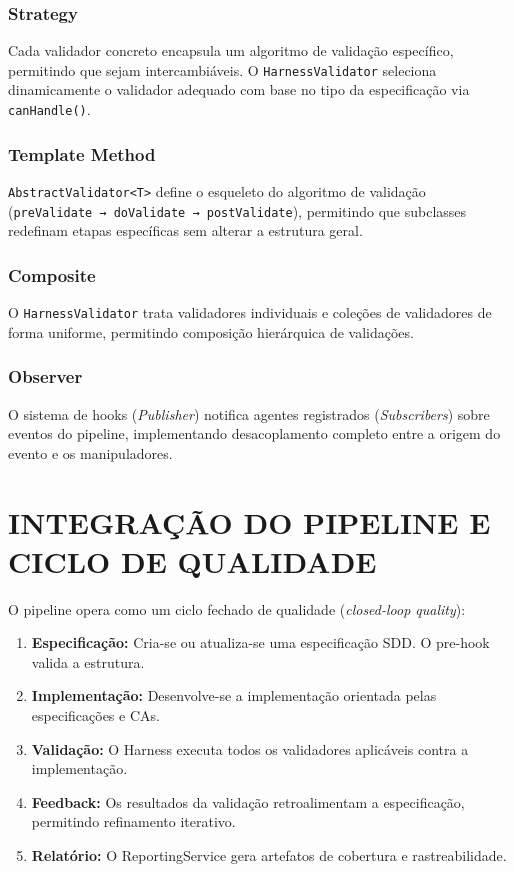 \documentclass[
  brazil,
  sumario=tradicional,
  10pt
]{abntex2}
\begin{document}
\subsubsection{Strategy}
Cada validador concreto encapsula um algoritmo de validação específico,
permitindo que sejam intercambiáveis. O \texttt{HarnessValidator}
seleciona dinamicamente o validador adequado com base no tipo da
especificação via \texttt{canHandle()}.

\subsubsection{Template Method}
\texttt{AbstractValidator<T>} define o esqueleto do algoritmo de
validação (\texttt{preValidate → doValidate → postValidate}),
permitindo que subclasses redefinam etapas específicas sem alterar
a estrutura geral.

\subsubsection{Composite}
O \texttt{HarnessValidator} trata validadores individuais e coleções
de validadores de forma uniforme, permitindo composição hierárquica
de validações.

\subsubsection{Observer}
O sistema de hooks (\textit{Publisher}) notifica agentes registrados
(\textit{Subscribers}) sobre eventos do pipeline, implementando
desacoplamento completo entre a origem do evento e os manipuladores.

\section{INTEGRAÇÃO DO PIPELINE E CICLO DE QUALIDADE}

O pipeline opera como um ciclo fechado de qualidade (\textit{closed-loop
quality}):

\begin{enumerate}
  \item \textbf{Especificação:} Cria-se ou atualiza-se uma especificação
    SDD. O pre-hook valida a estrutura.
  \item \textbf{Implementação:} Desenvolve-se a implementação orientada
    pelas especificações e CAs.
  \item \textbf{Validação:} O Harness executa todos os validadores
    aplicáveis contra a implementação.
  \item \textbf{Feedback:} Os resultados da validação retroalimentam a
    especificação, permitindo refinamento iterativo.
  \item \textbf{Relatório:} O ReportingService gera artefatos de
    cobertura e rastreabilidade.
\end{enumerate}
\end{document}
